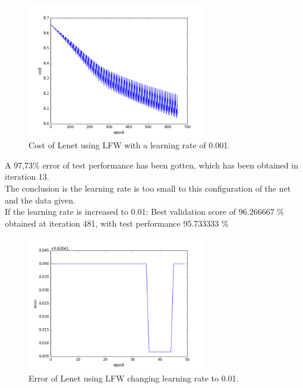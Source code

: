 \begin{figure}[htb]
\centering
\includegraphics[width=0.7\textwidth]{images/LFW_learningrate/cost_0_001.png}
\caption{Cost of Lenet using LFW with a learning rate of 0.001.} \label{fig:LENETLFWcost0-001}
\end{figure}

A 97,73\% error of test performance has been gotten, which has been obtained in iteration 13. \\

The conclusion is the learning rate is too small to this configuration of the net and the data given.\\

If the learning rate is increased to 0.01: Best validation score of 96.266667 \% obtained at iteration 481, with test performance 95.733333 \%\\

\begin{figure}[htb]
\centering
\includegraphics[width=0.7\textwidth]{images/LFW_learningrate/error_0_01.png}
\caption{Error of Lenet using LFW changing learning rate to 0.01.} \label{fig:LENETLFW_lr0_01}
\end{figure}

